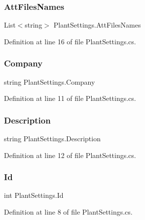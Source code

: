\subsubsection{\texorpdfstring{AttFilesNames}{AttFilesNames}}
{\footnotesize\ttfamily List$<$string$>$ Plant\+Settings.\+Att\+Files\+Names}



Definition at line 16 of file Plant\+Settings.\+cs.

\mbox{\label{class_plant_settings_a1c1f7e402e63c8d9bbcb91e56cc1e4df}} 
\subsubsection{\texorpdfstring{Company}{Company}}
{\footnotesize\ttfamily string Plant\+Settings.\+Company}



Definition at line 11 of file Plant\+Settings.\+cs.

\mbox{\label{class_plant_settings_af526aceb5c55f8d2fa36fc7633179827}} 
\subsubsection{\texorpdfstring{Description}{Description}}
{\footnotesize\ttfamily string Plant\+Settings.\+Description}



Definition at line 12 of file Plant\+Settings.\+cs.

\mbox{\label{class_plant_settings_a1f2ff2b67f41524fa46c571179c94520}} 
\subsubsection{\texorpdfstring{Id}{Id}}
{\footnotesize\ttfamily int Plant\+Settings.\+Id}



Definition at line 8 of file Plant\+Settings.\+cs.

\mbox{\label{class_plant_settings_a188bcd3b0e807284256f4fe8ac12bde5}} 
